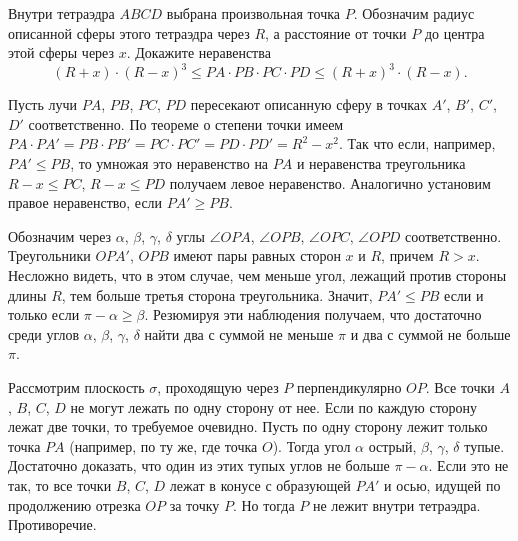 Внутри тетраэдра $ABCD$ выбрана произвольная точка $P$.
Обозначим радиус описанной сферы этого тетраэдра через $R$, а расстояние от
точки $P$ до центра этой сферы через $x$.
Докажите неравенства
\[
    (R + x) \cdot (R - x)^3
\leq
    PA \cdot PB \cdot PC \cdot PD
\leq
    (R + x)^3 \cdot (R - x)
.\]

\solution
Пусть лучи $PA$, $PB$, $PC$, $PD$ пересекают описанную сферу в точках
$A'$, $B'$, $C'$, $D'$ соответственно.
По теореме о степени точки имеем
$PA \cdot PA' = PB \cdot PB' = PC \cdot PC' = PD \cdot PD' = R^2 - x^2$.
Так что если, например, $PA' \leq PB$, то умножая это неравенство на $PA$ и
неравенства треугольника $R - x \leq PC$, $R - x \leq PD$ получаем левое
неравенство.
Аналогично установим правое неравенство, если $PA' \geq PB$.
\par
Обозначим через $\alpha$, $\beta$, $\gamma$, $\delta$ углы
$\angle OPA$, $\angle OPB$, $\angle OPC$, $\angle OPD$ соответственно.
Треугольники $OPA'$, $OPB$ имеют пары равных сторон $x$ и $R$, причем $R > x$.
Несложно видеть, что в этом случае, чем меньше угол, лежащий против стороны
длины $R$, тем больше третья сторона треугольника.
Значит, $PA' \leq PB$ если и только если $\pi - \alpha \geq \beta$.
Резюмируя эти наблюдения получаем, что достаточно среди углов
$\alpha$, $\beta$, $\gamma$, $\delta$ найти два с суммой не меньше $\pi$ и
два с суммой не больше $\pi$.
\par
Рассмотрим плоскость $\sigma$, проходящую через $P$ перпендикулярно $OP$.
Все точки $A$, $B$, $C$, $D$ не могут лежать по одну сторону от нее.
Если по каждую сторону лежат две точки, то требуемое очевидно.
Пусть по одну сторону лежит только точка $PA$
(например, по ту же, где точка $O$).
Тогда угол  $\alpha$ острый, $\beta$, $\gamma$, $\delta$ тупые.
Достаточно доказать, что один из этих тупых углов не больше $\pi - \alpha$.
Если это не так, то все точки $B$, $C$, $D$ лежат в конусе с образующей $PA'$ и осью, идущей по продолжению отрезка $OP$ за точку $P$.
Но тогда $P$ не лежит внутри тетраэдра.
Противоречие.

